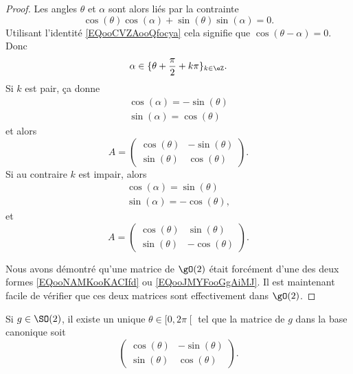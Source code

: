 \begin{proof}
	Les angles \( \theta\) et \( \alpha\) sont alors liés par la contrainte
	\begin{equation}
		\cos(\theta)\cos(\alpha)+\sin(\theta)\sin(\alpha)=0.
	\end{equation}
	Utilisant l'identité \eqref{EQooCVZAooQfocya} cela signifie que \( \cos(\theta-\alpha)=0\). Donc
	\begin{equation}
		\alpha\in\{ \theta+\frac{ \pi }{2}+k\pi \}_{k\in \eZ}.
	\end{equation}
	Si \( k\) est pair, ça donne
	\begin{subequations}
		\begin{align}
			\cos(\alpha)=-\sin(\theta) \\
			\sin(\alpha)=\cos(\theta)
		\end{align}
	\end{subequations}
	et alors
	\begin{equation}        \label{EQooNAMKooKACIfd}
		A=\begin{pmatrix}
			\cos(\theta) & -\sin(\theta) \\
			\sin(\theta) & \cos(\theta)
		\end{pmatrix}.
	\end{equation}
	Si au contraire \( k\) est impair, alors
	\begin{subequations}
		\begin{align}
			\cos(\alpha)=\sin(\theta) \\
			\sin(\alpha)=-\cos(\theta),
		\end{align}
	\end{subequations}
	et
	\begin{equation}        \label{EQooJMYFooGgAiMJ}
		A=\begin{pmatrix}
			\cos(\theta) & \sin(\theta)  \\
			\sin(\theta) & -\cos(\theta)
		\end{pmatrix}.
	\end{equation}

	Nous avons démontré qu'une matrice de \( \gO(2)\) était forcément d'une des deux formes \eqref{EQooNAMKooKACIfd} ou \eqref{EQooJMYFooGgAiMJ}. Il est maintenant facile de vérifier que ces deux matrices sont effectivement dans \( \gO(2)\).
\end{proof}

\begin{lemma}       \label{LEMooHRESooQTrpMz}
	Si \( g\in\SO(2)\), il existe un unique \( \theta\in\mathopen[ 0 , 2\pi \mathclose[\) tel que la matrice de \( g\) dans la base canonique soit
	\begin{equation}
		\begin{pmatrix}
			\cos(\theta) & -\sin(\theta) \\
			\sin(\theta) & \cos(\theta)
		\end{pmatrix}.
	\end{equation}
\end{lemma}

